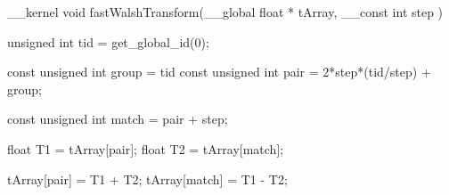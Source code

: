 __kernel
void fastWalshTransform(__global float * tArray,
                        __const  int   step
                       )
{
    unsigned int tid = get_global_id(0);

    const unsigned int group = tid%
    const unsigned int pair  = 2*step*(tid/step) + group;

    const unsigned int match = pair + step;

    float T1          = tArray[pair];
    float T2          = tArray[match];

    tArray[pair]             = T1 + T2;
    tArray[match]            = T1 - T2;
}
